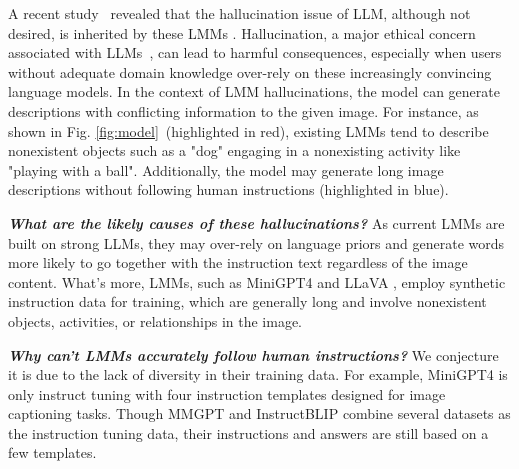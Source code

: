 A recent study~\cite{li2023otter}   revealed that the hallucination issue of LLM, although not desired, is inherited by these LMMs \cite{zhu2023minigpt, liu2023visual, gong2023multimodal, dai2023instructblip}. %
Hallucination, a major ethical concern associated with LLMs~\cite{bang2023multitask}, can lead to harmful consequences,
especially when users without adequate domain knowledge over-rely on these increasingly convincing language models.
In the context of LMM hallucinations, the model can generate descriptions with conflicting information to the given image. For instance, as shown in Fig. \ref{fig:model}~(highlighted in red), existing LMMs \cite{zhu2023minigpt, liu2023visual, dai2023instructblip, gong2023multimodal} tend to describe nonexistent objects such as a "dog" engaging in a nonexisting activity like "playing with a ball".
Additionally, the model may generate long image descriptions without following human instructions (highlighted in blue). 

\textbf{\textit{What are the likely causes of these hallucinations?}} As current LMMs are built on strong LLMs, they may over-rely on language priors and generate words more likely to go together with the instruction text regardless of the image content. What's more, LMMs, such as MiniGPT4 \cite{zhu2023minigpt} and LLaVA \cite{liu2023visual}, employ synthetic instruction data for training,  which are generally long and involve nonexistent objects, activities, or relationships in the image.

\textbf{\textit{Why can't LMMs accurately follow human instructions?}} We conjecture it is due to the lack of diversity in their training data. For example, MiniGPT4 \cite{zhu2023minigpt} is only instruct tuning with four instruction templates designed for image captioning tasks. Though MMGPT \cite{gong2023multimodal} and InstructBLIP \cite{dai2023instructblip} combine several datasets as the instruction tuning data, their instructions and answers are still based on a few templates.


